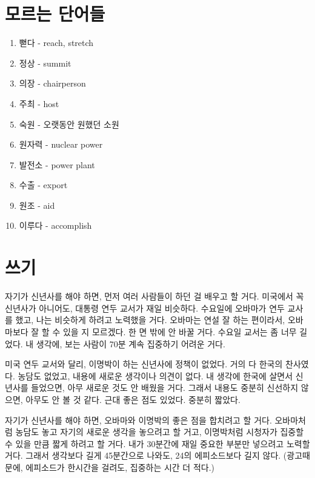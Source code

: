 \documentclass{article}
\begin{document}
\section{모르는 단어들}
\begin{enumerate}
  \item 뻗다 - reach, stretch
  \item 정상 - summit
  \item 의장 - chairperson
  \item 주최 - host
  \item 숙원 - 오랫동안 원했던 소원
  \item 원자력 - nuclear power
  \item 발전소 - power plant
  \item 수출 - export
  \item 원조 - aid
  \item 이루다 - accomplish
\end{enumerate}

\section{쓰기}
자기가 신년사를 해야 하면, 먼저 여러 사람들이 하던 걸 배우고 할 거다.  미국에서 꼭 신년사가 아니어도, 대통령 연두 교서가 재일 비슷하다.  수요일에 오바마가 연두 교사를 했고, 나는  비슷하게 하려고 노력했을 거다.  오바마는 연설 잘 하는 편이라서, 오바마보다 잘 할 수 있을 지 모르겠다.  한 면 밖에 안 바꿀 거다.  수요일 교서는 좀 너무 길었다. 내 생각에, 보는 사람이 70분 계속 집중하기 어려운 거다.

미국 연두 교서와 달리, 이명박이 하는 신년사에 정책이 없었다.  거의 다 한국의 찬사였다.  농담도 없었고, 내용에 새로운 생각이나 의견이 없다. 내 생각에 한국에 살면서 신년사를 들었으면, 아무 새로운 것도 안 배웠을 거다.  그래서 내용도 중분히 신선하지 않으면, 아무도 안 볼 것 같다.  근대 좋은 점도 있었다.  중분히 짧았다.  

자기가 신년사를 해야 하면, 오바마와 이명박의 좋은 점을 합치려고 할 거다.  오바마처럼 농담도 놓고 자기의 새로운 생각을 놓으려고 할 거고, 이명박처럼 시청자가 집중할 수 있을 만큼 짧게 하려고 할 거다. 내가 30분간에 재일 중요한 부분만 넣으려고 노력할 거다.  그래서 생각보다 길게 45분간으로 나와도, 24의 에피소드보다 길지 않다. (광고때문에, 에피소드가 한시간을 걸려도, 집중하는 시간 더 적다.)
\end{document}
